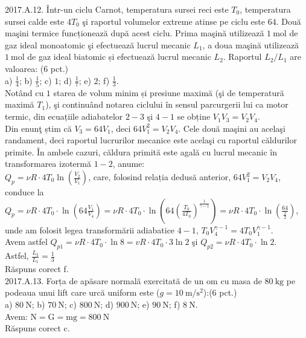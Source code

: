 2017.A.12. Într-un ciclu Carnot, temperatura sursei reci este $T_{0}$, temperatura sursei calde este $4 T_{0}$ şi raportul volumelor extreme atinse pe ciclu este $64$. Două maşini termice funcționează după acest ciclu. Prima maşină utilizează $1 \mathrm{~mol}$ de gaz ideal monoatomic şi efectuează lucrul mecanic $L_{1}$, a doua maşină utilizează $1 \mathrm{~mol}$ de gaz ideal biatomic și efectuează lucrul mecanic $L_{2}$. Raportul $L_{2} / L_{1}$ are valoarea: (6 pct.)\\ a) $\frac{1}{4}$; b) $\frac{1}{5}$; c) $1$; d) $\frac{1}{7}$; e) $2$; f) $\frac{1}{3}$.\\ Notând cu $1$ starea de volum minim și presiune maximă (şi de temperatură maximă $T_{1}$), şi continuând notarea ciclului în sensul parcurgerii lui ca motor termic, din ecuațiile adiabatelor $2-3$ şi $4-1$ se obține $V_{1} V_{3}=V_{2} V_{4}$.\\ Din enunţ știm că $V_{3}=64 V_{1}$, deci $64 V_{1}^{2}=V_{2} V_{4}$. Cele două maşini au acelaşi randament, deci raportul lucrurilor mecanice este acelaşi cu raportul căldurilor primite. În ambele cazuri, căldura primită este agală cu lucrul mecanic în transformarea izotermă $1-2$, anume:\\ $Q_{p}=\nu R \cdot 4 T_{0} \ln \left(\frac{V_{2}}{V_{1}}\right)$, care, folosind relația dedusă anterior, $64 V_{1}^{2}=V_{2} V_{4}$, conduce la $Q_{p}=\nu R \cdot 4 T_{0} \cdot \ln \left(64 \frac{V_{1}}{V_{4}}\right)=\nu R \cdot 4 T_{0} \cdot \ln \left(64\left(\frac{T_{0}}{4 T_{0}}\right)^{\frac{1}{\gamma-1}}\right)=\nu R \cdot 4 T_{0} \cdot \ln \left(\frac{64}{\frac{2}{2}}\right)$, unde am folosit legea transformării adiabatice $4-1$, $T_{0} V_{4}^{\gamma-1}=4 T_{0} V_{1}^{\gamma-1}$.\\ Avem astfel $Q_{p 1}=\nu R \cdot 4 T_{0} \cdot \ln 8=v R \cdot 4 T_{0} \cdot 3 \ln 2$ şi $Q_{p 2}=\nu R \cdot 4 T_{0} \cdot \ln 2$.\\ Astfel, $\frac{L_{2}}{L_{1}}=\frac{1}{3}$\\ Răspuns corect f.\\

2017.A.13. Forța de apăsare normală exercitată de un om cu masa de $80 \mathrm{~kg}$ pe podeaua unui lift care urcă uniform este ($g=10 \mathrm{~m} / \mathrm{s}^{2}$):(6 pct.)\\ a) $80 \mathrm{~N}$; b) $70 \mathrm{~N}$; c) $800 \mathrm{~N}$; d) $900 \mathrm{~N}$; e) $90 \mathrm{~N}$; f) $8 \mathrm{~N}$.\\ Avem: $\mathrm{N}=\mathrm{G}=\mathrm{mg}=800 \mathrm{~N}$\\ Răspuns corect c.\\

